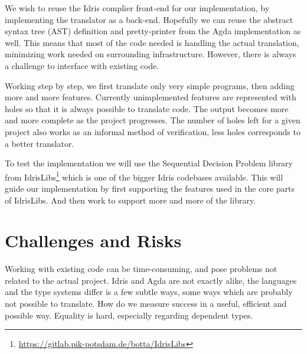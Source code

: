 \documentclass[parskip=half]{scrartcl}
\begin{document}



We wish to reuse the Idris complier front-end for our implementation, by
implementing the translator as a back-end. Hopefully we can reuse the abstract
syntax tree (AST) definition and pretty-printer from the Agda implementation as
well. This means that most of the code needed is handling the actual
translation, minimizing work needed on surrounding infrastructure.  However,
there is always a challenge to interface with existing code.


Working step by step, we first translate only very simple programs, then adding
more and more features. Currently unimplemented features are represented with
holes so that it is always possible to translate code. The output becomes more
and more complete as the project progresses. The number of holes left for
a given project also works as an informal method of verification, less holes
corresponds to a better translator.

To test the implementation we will use the Sequential Decision Problem library
from IdrisLibs\footnote{\url{https://gitlab.pik-potsdam.de/botta/IdrisLibs}} which is one
of the bigger Idris codebases available. This will guide our implementation by
first supporting the features used in the core parts of IdrisLibs. And then
work to support more and more of the library.


\section{Challenges and Risks}
Working with existing code can be time-consuming, and pose problems not related
to the actual project.  Idris and Agda are not exactly alike, the languages and
the type systems differ is a few subtle ways, some ways which are probably not
possible to translate.  How do we measure success in a useful, efficient and
possible way. Equality is hard, especially regarding dependent types.
\end{document}
